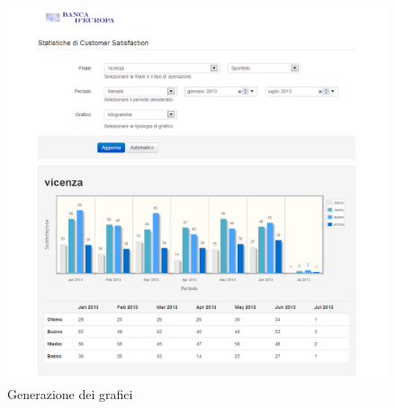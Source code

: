  \begin{figure}[!h]
    \begin{center}
      \includegraphics[scale=0.35]{icons/screen_graph.png}
      \caption{Generazione dei grafici}
      \label{fig:screen_graph}
    \end{center}
  \end{figure}
